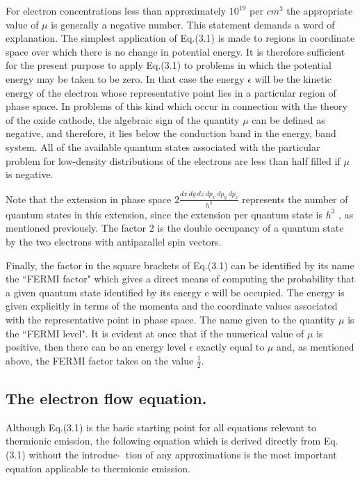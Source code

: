 \documentclass[11pt,a4paper]{article}
\begin{document}
	For electron concentrations less than approximately $10^{19}$ per $cm^3$ the appropriate value of $\mu$  is generally a negative number. This statement demands a
	word of explanation. The simplest application of Eq.(3.1) is made to regions
	in coordinate space over which there is no change in potential energy. It is
	therefore sufficient for the present purpose to apply Eq.(3.1) to problems in
	which the potential energy may be taken to be zero. In that case the energy $\epsilon$ 
	will be the kinetic energy of the electron whose representative point lies in a
	particular region of phase space. In problems of this kind which occur in connection with the theory of the oxide cathode, the algebraic sign of the quantity $\mu$ 
	can be defined as negative, and therefore, it lies below the conduction band in
	the energy, band system. All of the available quantum states associated with
	the particular problem for low-density distributions of the electrons are less
	than half filled if $\mu$  is negative.
	
	Note that the extension in phase space $2 \frac{dx ~ dy ~ dz ~ dp_x  ~ dp_y ~ dp_z}{h^3}$ represents
	the number of quantum states in this extension, since the extension per quantum
	state is $h^3$
	, as mentioned previously. The factor 2 is the double occupancy of a
	quantum state by the two electrons with antiparallel spin vectors.
	
	
	Finally, the factor in the square brackets of Eq.(3.1) can be identified by
	its name the ``FERMI factor" which gives a direct means of computing the
	probability that a given quantum state identified by its energy e will be occupied.
	The energy is given explicitly in terms of the momenta and the coordinate values
	associated with the representative point in phase space. The name given to
	the quantity $\mu$  is the ``FERMI level". It is evident at once that if the numerical
	value of $\mu$  is positive, then there can be an energy level $\epsilon$ exactly equal to $\mu$  and,
	as mentioned above, the FERMI factor takes on the value $\frac{1}{2}$.
	
	\subsection{The electron flow equation.}
	
	Although Eq.(3.1) is the basic starting point for all equations relevant to thermionic emission, the following equation which is derived directly from Eq.(3.1) without the introduc-\ tion of any approximations is the most important equation applicable to thermionic emission.
	
\end{document}
